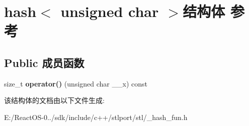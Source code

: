 \hypertarget{structhash_3_01unsigned_01char_01_4}{}\section{hash$<$ unsigned char $>$结构体 参考}
\label{structhash_3_01unsigned_01char_01_4}
\subsection*{Public 成员函数}
\begin{DoxyCompactItemize}
\item 
\mbox{\label{structhash_3_01unsigned_01char_01_4_a5ff5f2c91af42d21e00fe718d623ca15}} 
size\+\_\+t {\bfseries operator()} (unsigned char \+\_\+\+\_\+x) const
\end{DoxyCompactItemize}


该结构体的文档由以下文件生成\+:\begin{DoxyCompactItemize}
\item 
E\+:/\+React\+O\+S-\/0../sdk/include/c++/stlport/stl/\+\_\+hash\+\_\+fun.\+h\end{DoxyCompactItemize}
